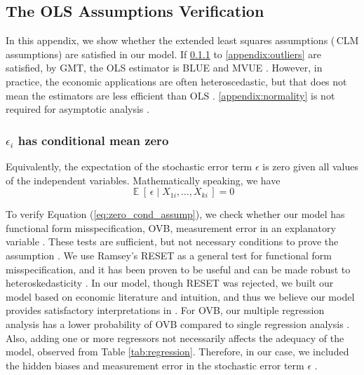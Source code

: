\subsection{The \acs{OLS} Assumptions Verification}
\label{appendix: assumptions}

In this appendix, we show whether the extended least squares assumptions (\ie\,\acs{CLM} assumptions) are satisfied in our model. If \ref{appendix:zero_cond_assump} to \ref{appendix:outliers} are satisfied, by \acs{GMT}, the \acs{OLS} estimator is \acs{BLUE} and \acs{MVUE} \cite{stock_watson_2019, wooldridge_2020}. However, in practice, the economic applications are often heteroscedastic, but that does not mean the estimators are less efficient than \acs{OLS} \cite{christopher_2006, stock_watson_2019}. \ref{appendix:normality} is not required for asymptotic analysis \cite{wooldridge_2020}.

\subsubsection{$\epsilon_{i}$ has conditional mean zero}\label{appendix:zero_cond_assump}
Equivalently, the expectation of the stochastic error term $\epsilon$ is zero given all values of the independent variables. Mathematically speaking, we have
\begin{equation} \label{eq:zero_cond_assump}
\mathop{\mathbb{E}}[\,\epsilon \mid X_{1i},\dots,X_{ki}\,]=0
\end{equation}

To verify Equation (\ref{eq:zero_cond_assump}), we check whether our model has functional form misspecification, \acs{OVB}, measurement error in an explanatory variable \cite{wooldridge_2020}. These tests are sufficient, but not necessary conditions to prove the assumption \cite{studenmund_2017}. We use Ramsey's \acs{RESET} as a general test for functional form misspecification, and it has been proven to be useful and can be made robust to heteroskedasticity \cite{christopher_2006, wooldridge_2020, studenmund_2017}. In our model, though \acs{RESET} was rejected, we built our model based on economic literature and intuition, and thus we believe our model provides satisfactory interpretations in \hyperref[sec:results]{}. For \acs{OVB}, our multiple regression analysis has a lower probability of \acs{OVB} compared to single regression analysis \cite{wooldridge_2020}. Also, adding one or more regressors not necessarily affects the adequacy of the model, observed from Table \ref{tab:regression}. Therefore, in our case, we included the hidden biases and measurement error in the stochastic error term $\epsilon$ \cite{studenmund_2017}.

